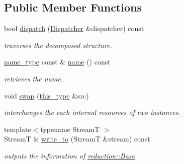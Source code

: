 \subsection*{Public Member Functions}
\begin{DoxyCompactItemize}
\item 
bool \hyperlink{classhryky_1_1reduction_1_1_base_a71b31d4d0ed915254e2cb1ef217f28c4}{dispatch} (\hyperlink{classhryky_1_1reduction_1_1_dispatcher}{Dispatcher} \&dispatcher) const 
\begin{DoxyCompactList}\small\item\em traverses the decomposed structure. \end{DoxyCompactList}\item 
\hypertarget{classhryky_1_1reduction_1_1_base_a842569265d741905eb8a353d3935f1d1}{\hyperlink{namespacehryky_1_1reduction_ac686c30a4c8d196bbd0f05629a6b921f}{name\-\_\-type} const \& \hyperlink{classhryky_1_1reduction_1_1_base_a842569265d741905eb8a353d3935f1d1}{name} () const }\label{classhryky_1_1reduction_1_1_base_a842569265d741905eb8a353d3935f1d1}

\begin{DoxyCompactList}\small\item\em retrieves the name. \end{DoxyCompactList}\item 
\hypertarget{classhryky_1_1reduction_1_1_base_ab2b137d16fbe40d839ee136bd5304cab}{void \hyperlink{classhryky_1_1reduction_1_1_base_ab2b137d16fbe40d839ee136bd5304cab}{swap} (\hyperlink{classhryky_1_1reduction_1_1_base_af02a7dee6042080b7380afd2f9500a42}{this\-\_\-type} \&src)}\label{classhryky_1_1reduction_1_1_base_ab2b137d16fbe40d839ee136bd5304cab}

\begin{DoxyCompactList}\small\item\em interchanges the each internal resources of two instances. \end{DoxyCompactList}\item 
\hypertarget{classhryky_1_1reduction_1_1_base_a709cc7c48e1c90fe253739e46d82aa19}{{\footnotesize template$<$typename Stream\-T $>$ }\\Stream\-T \& \hyperlink{classhryky_1_1reduction_1_1_base_a709cc7c48e1c90fe253739e46d82aa19}{write\-\_\-to} (Stream\-T \&stream) const }\label{classhryky_1_1reduction_1_1_base_a709cc7c48e1c90fe253739e46d82aa19}

\begin{DoxyCompactList}\small\item\em outputs the information of \hyperlink{classhryky_1_1reduction_1_1_base}{reduction\-::\-Base}. \end{DoxyCompactList}\end{DoxyCompactItemize}
